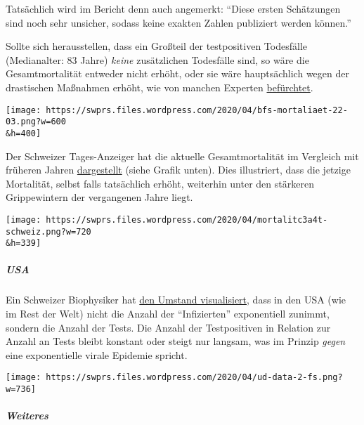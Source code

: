 Tatsächlich wird im Bericht denn auch angemerkt: ``Diese ersten
Schätzungen sind noch sehr unsicher, sodass keine exakten Zahlen
publiziert werden können.''

Sollte sich herausstellen, dass ein Großteil der testpositiven
Todesfälle (Medianalter: 83 Jahre) \emph{keine} zusätzlichen Todesfälle
sind, so wäre die Gesamtmortalität entweder nicht erhöht, oder sie wäre
hauptsächlich wegen der drastischen Maßnahmen erhöht, wie von manchen
Experten
\href{https://swprs.org/offener-brief-von-professor-sucharit-bhakdi-an-bundeskanzlerin-dr-angela-merkel/}{befürchtet}.

\texttt{[image: https://swprs.files.wordpress.com/2020/04/bfs-mortaliaet-22-03.png?w=600\\\&h=400]}

Der Schweizer Tages-Anzeiger hat die aktuelle Gesamtmortalität im
Vergleich mit früheren Jahren
\href{https://interaktiv.tagesanzeiger.ch/2020/uebersterblichkeit-wegen-coronavirus/}{dargestellt}
(siehe Grafik unten). Dies illustriert, dass die jetzige Mortalität,
selbst falls tatsächlich erhöht, weiterhin unter den stärkeren
Grippewintern der vergangenen Jahre liegt.

\texttt{[image: https://swprs.files.wordpress.com/2020/04/mortalitc3a4t-schweiz.png?w=720\\\&h=339]}

\hypertarget{usa}{%
\subparagraph{\texorpdfstring{\textbf{USA}}{USA}}\label{usa}}

Ein Schweizer Biophysiker hat
\href{https://swprs.org/rate-of-positive-covid19-tests/}{den Umstand
visualisiert}, dass in den USA (wie im Rest der Welt) nicht die Anzahl
der ``Infizierten'' exponentiell zunimmt, sondern die Anzahl der Tests.
Die Anzahl der Test­positiven in Relation zur Anzahl an Tests bleibt
konstant oder steigt nur langsam, was im Prinzip \emph{gegen} eine
exponentielle virale Epidemie spricht.

\texttt{[image: https://swprs.files.wordpress.com/2020/04/ud-data-2-fs.png?w=736]}

\hypertarget{weiteres}{%
\subparagraph{\texorpdfstring{\textbf{Weiteres}}{Weiteres}}\label{weiteres}}

